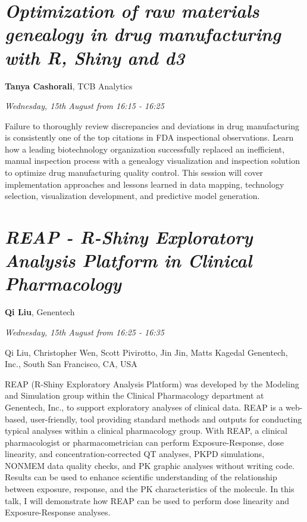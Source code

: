 \documentclass[]{book}
\theoremstyle{definition}
\theoremstyle{definition}
\theoremstyle{definition}
\theoremstyle{remark}
\begin{document}
\hypertarget{optimization-of-raw-materials-genealogy-in-drug-manufacturing-with-r-shiny-and-d3-1}{%
\section{\texorpdfstring{\emph{Optimization of raw materials genealogy
in drug manufacturing with R, Shiny and
d3}}{Optimization of raw materials genealogy in drug manufacturing with R, Shiny and d3}}\label{optimization-of-raw-materials-genealogy-in-drug-manufacturing-with-r-shiny-and-d3-1}}

\textbf{Tanya Cashorali}, TCB Analytics

\emph{Wednesday, 15th August from 16:15 - 16:25}

Failure to thoroughly review discrepancies and deviations in drug
manufacturing is consistently one of the top citations in FDA
inspectional observations. Learn how a leading biotechnology
organization successfully replaced an inefficient, manual inspection
process with a genealogy visualization and inspection solution to
optimize drug manufacturing quality control. This session will cover
implementation approaches and lessons learned in data mapping,
technology selection, visualization development, and predictive model
generation.

\hypertarget{reap---r-shiny-exploratory-analysis-platform-in-clinical-pharmacology-1}{%
\section{\texorpdfstring{\emph{REAP - R-Shiny Exploratory Analysis
Platform in Clinical
Pharmacology}}{REAP - R-Shiny Exploratory Analysis Platform in Clinical Pharmacology}}\label{reap---r-shiny-exploratory-analysis-platform-in-clinical-pharmacology-1}}

\textbf{Qi Liu}, Genentech

\emph{Wednesday, 15th August from 16:25 - 16:35}

Qi Liu, Christopher Wen, Scott Pivirotto, Jin Jin, Matts Kagedal
Genentech, Inc., South San Francisco, CA, USA

REAP (R-Shiny Exploratory Analysis Platform) was developed by the
Modeling and Simulation group within the Clinical Pharmacology
department at Genentech, Inc., to support exploratory analyses of
clinical data. REAP is a web-based, user-friendly, tool providing
standard methods and outputs for conducting typical analyses within a
clinical pharmacology group. With REAP, a clinical pharmacologist or
pharmacometrician can perform Exposure-Response, dose linearity, and
concentration-corrected QT analyses, PKPD simulations, NONMEM data
quality checks, and PK graphic analyses without writing code. Results
can be used to enhance scientific understanding of the relationship
between exposure, response, and the PK characteristics of the molecule.
In this talk, I will demonstrate how REAP can be used to perform dose
linearity and Exposure-Response analyses.
\end{document}
